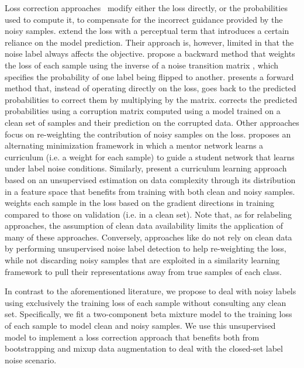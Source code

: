 \documentclass{article}
\begin{document}
Loss correction approaches~\cite{2015_ICLR_Bootstrapping,2018_ICML_MentorNet,2017_CVPR_ForwardLoss,2018_ICLR_mixup}
modify either the loss directly, or the probabilities used to compute
it, to compensate for the incorrect guidance provided by the noisy
samples. \cite{2015_ICLR_Bootstrapping} extend the loss with
a perceptual term that introduces a certain reliance on the model prediction. Their approach is, however, limited in that the noise
label always affects the objective. \cite{2017_CVPR_ForwardLoss}
propose a backward method that weights the loss of each sample using
the inverse of a noise transition matrix , which specifies the probability
of one label being flipped to another. \cite{2017_CVPR_ForwardLoss}
presents a forward method that, instead of operating directly on the
loss, goes back to the predicted probabilities to correct them by
multiplying by the  matrix.  \cite{2018_NIPS_GoldLoss}
corrects the predicted probabilities using a corruption matrix computed
using a model trained on a clean set of samples and their prediction
on the corrupted data. Other approaches focus on re-weighting
the contribution of noisy samples on the loss. \cite{2018_ICML_MentorNet}
proposes an alternating minimization framework in which a mentor network
learns a curriculum (i.e. a weight for each sample) to guide a student
network that learns under label noise conditions. Similarly, \cite{2018_ECCV_CurrNet}
present a curriculum learning approach based on an unsupervised estimation
on data complexity through its distribution in a feature space that
benefits from training with both clean and noisy samples. 
\cite{2018_ICML_L2ReweightNoise} weights each sample in the loss
based on the gradient directions in training compared to those on
validation (i.e. in a clean set). Note that, as for relabeling approaches,
the assumption of clean data availability limits the application of
many of these approaches. Conversely, approaches like \cite{2018_CVPR_IterativeNoise}
do not rely on clean data by performing unsupervised noise label detection
to help re-weighting the loss, while not discarding noisy samples
that are exploited in a similarity learning framework to pull their
representations away from true samples of each class.

In contrast to the aforementioned literature, we propose to deal with
noisy labels using exclusively the training loss of each sample without
consulting any clean set. Specifically, we fit a two-component
beta mixture model to the training loss of each sample to model clean
and noisy samples. We use this unsupervised model to implement
a loss correction approach that benefits both from bootstrapping \cite{2015_ICLR_Bootstrapping}
and mixup data augmentation \cite{2018_ICLR_mixup} to deal with the
closed-set label noise scenario.
\end{document}
